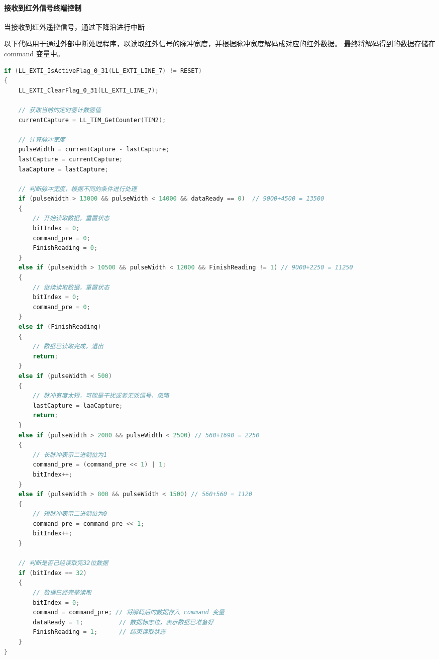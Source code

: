 \documentclass{article}
\begin{document}
\paragraph{接收到红外信号终端控制}当接收到红外遥控信号，通过下降沿进行中断\par
以下代码用于通过外部中断处理程序，以读取红外信号的脉冲宽度，并根据脉冲宽度解码成对应的红外数据。
最终将解码得到的数据存储在 command 变量中。\par
\begin{multicols}{2}
\begin{lstlisting}[language=c]
if (LL_EXTI_IsActiveFlag_0_31(LL_EXTI_LINE_7) != RESET)
{
    LL_EXTI_ClearFlag_0_31(LL_EXTI_LINE_7);

    // 获取当前的定时器计数器值
    currentCapture = LL_TIM_GetCounter(TIM2);

    // 计算脉冲宽度
    pulseWidth = currentCapture - lastCapture;
    lastCapture = currentCapture;
    laaCapture = lastCapture;

    // 判断脉冲宽度，根据不同的条件进行处理
    if (pulseWidth > 13000 && pulseWidth < 14000 && dataReady == 0)  // 9000+4500 = 13500
    {
        // 开始读取数据，重置状态
        bitIndex = 0;
        command_pre = 0;
        FinishReading = 0;
    }
    else if (pulseWidth > 10500 && pulseWidth < 12000 && FinishReading != 1) // 9000+2250 = 11250
    {
        // 继续读取数据，重置状态
        bitIndex = 0;
        command_pre = 0;
    }
    else if (FinishReading)
    {
        // 数据已读取完成，退出
        return;
    }
    else if (pulseWidth < 500)
    {
        // 脉冲宽度太短，可能是干扰或者无效信号，忽略
        lastCapture = laaCapture;
        return;
    }
    else if (pulseWidth > 2000 && pulseWidth < 2500) // 560+1690 = 2250
    {
        // 长脉冲表示二进制位为1
        command_pre = (command_pre << 1) | 1;
        bitIndex++;
    }
    else if (pulseWidth > 800 && pulseWidth < 1500) // 560+560 = 1120
    {
        // 短脉冲表示二进制位为0
        command_pre = command_pre << 1;
        bitIndex++;
    }

    // 判断是否已经读取完32位数据
    if (bitIndex == 32)
    {
        // 数据已经完整读取
        bitIndex = 0;
        command = command_pre; // 将解码后的数据存入 command 变量
        dataReady = 1;          // 数据标志位，表示数据已准备好
        FinishReading = 1;      // 结束读取状态
    }
}
\end{lstlisting}
\end{multicols}
\end{document}
